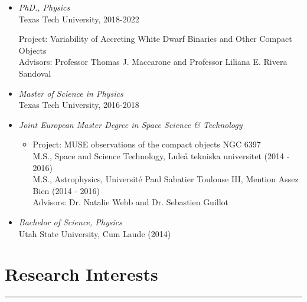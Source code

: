 \documentclass[letterpaper,10pt]{article}
\begin{document}
\begin{itemize}[label=$\blacktriangleright$]

  \item \emph{PhD., Physics}  \\
   Texas Tech University, 2018-2022
      \begin{itemize}[label=]
     Project: Variability of Accreting White Dwarf Binaries and Other Compact Objects  \\
     Advisors: Professor Thomas J. Maccarone and Professor Liliana E. Rivera Sandoval 
     
      \end{itemize}





  \item \emph{Master of Science in Physics}  \\
   Texas Tech University, 2016-2018



  \item \emph{Joint European Master Degree in Space Science \& Technology} 
  \begin{itemize}[label=]
      \vspace{-.05cm}
      \item Project: MUSE observations of the compact objects NGC 6397 \\
      M.S., Space and Science Technology, Lule\r a tekniska universitet  (2014 - 2016) \\
      M.S., Astrophysics, Universit\'e Paul Sabatier Toulouse III, Mention Assez Bien (2014 - 2016) \\
      Advisors: Dr. Natalie Webb and Dr. Sebastien Guillot
  \end{itemize}




  \item \emph{Bachelor of Science, Physics}  \\
   Utah State University, Cum Laude (2014)

\end{itemize}


\section*{Research Interests}

\hrule
\vspace{.3 cm}
\end{document}
